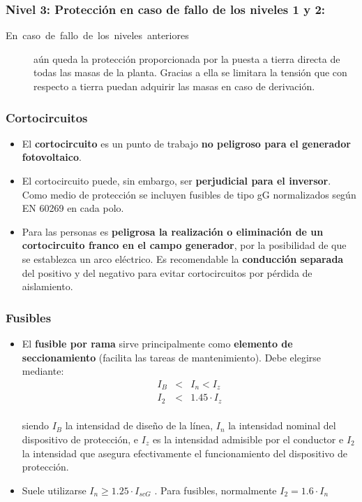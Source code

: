 \documentclass[serif, xcolor=dvipsnames]{beamer}
\begin{document}
\begin{frame}
\frametitle{Nivel 3: Protección en caso de fallo de los niveles 1 y 2: }
\begin{description}
\item [{En~caso~de~fallo~de~los~niveles~anteriores}] aún queda la
protección proporcionada por la puesta a tierra directa de todas las
masas de la planta. Gracias a ella se limitara la tensión que con
respecto a tierra puedan adquirir las masas en caso de derivación.
\end{description}

\end{frame}

\begin{frame}
\frametitle{Cortocircuitos}
\begin{itemize}
\item El \textbf{cortocircuito} es un punto de trabajo \textbf{no peligroso
para el generador fotovoltaico}.
\item El cortocircuito puede, sin embargo, ser \textbf{perjudicial para
el inversor}. Como medio de protección se incluyen fusibles de tipo
gG normalizados según EN 60269 en cada polo.
\item Para las personas es \textbf{peligrosa la realización o eliminación
de un cortocircuito franco en el campo generador}, por la posibilidad
de que se establezca un arco eléctrico. Es recomendable la \textbf{conducción
separada} del positivo y del negativo para evitar cortocircuitos por
pérdida de aislamiento.
\end{itemize}

\end{frame}

\begin{frame}
\frametitle{Fusibles}
\begin{itemize}
\item El \textbf{fusible por rama} sirve principalmente como \textbf{elemento
de seccionamiento} (facilita las tareas de mantenimiento). Debe elegirse
mediante: \begin{eqnarray*}
I_{B} & < & I_{n}<I_{z}\\
I_{2} & < & 1.45\cdot I_{z}\end{eqnarray*}
\\
siendo $I_{B}$ la intensidad de diseño de la línea, $I_{n}$ la
intensidad nominal del dispositivo de protección, e $I_{z}$ es la
intensidad admisible por el conductor e $I_{2}$ la intensidad que
asegura efectivamente el funcionamiento del dispositivo de protección.
\item Suele utilizarse $I_{n}\geq1.25\cdot I_{scG}$ . Para fusibles, normalmente
$I_{2}=1.6\cdot I_{n}$
\end{itemize}

\end{frame}
\end{document}
